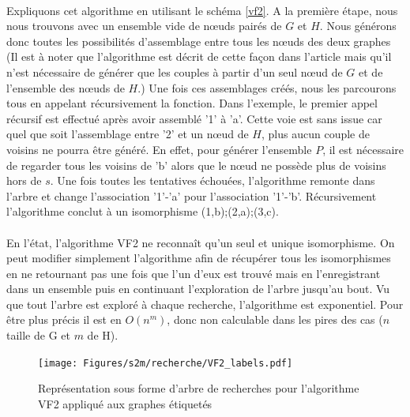 \documentclass[12pt,french,twoside]{report}
\begin{document}
\paragraph{}Expliquons cet algorithme en utilisant le schéma \ref{vf2}.
A la première étape, nous nous trouvons avec un ensemble vide de n\oe{}uds pairés de $G$ et $H$.
Nous générons donc toutes les possibilités d'assemblage entre tous les n\oe{}uds des deux graphes (Il est à noter que l'algorithme
est décrit de cette façon dans l'article mais qu'il n'est nécessaire de générer que les couples à partir d'un seul n\oe{}ud de $G$
et de l'ensemble des n\oe{}uds de $H$.)
Une fois ces assemblages créés, nous les parcourons tous en appelant récursivement la fonction.
Dans l'exemple, le premier appel récursif est effectué après avoir assemblé '1' à 'a'.
Cette voie est sans issue car quel que soit l'assemblage entre '2' et un n\oe{}ud de $H$, plus aucun couple de voisins ne pourra être
généré.
En effet, pour générer l'ensemble $P$, il est nécessaire de regarder tous les voisins de 'b' alors que le n\oe{}ud ne possède plus
de voisins hors de $s$.
Une fois toutes les tentatives échouées, l'algorithme remonte dans l'arbre et change l'association '1'-'a' pour l'association
'1'-'b'.
Récursivement l'algorithme conclut à un isomorphisme {(1,b);(2,a);(3,c)}.

\paragraph{}En l'état, l'algorithme VF2 ne reconnaît qu'un seul et unique isomorphisme.
On peut modifier simplement l'algorithme afin de récupérer tous les isomorphismes en ne retournant pas une fois que l'un d'eux est
trouvé mais en l'enregistrant dans un ensemble puis en continuant l'exploration de l'arbre jusqu'au bout.
Vu que tout l'arbre est exploré à chaque recherche, l'algorithme est exponentiel.
Pour être plus précis il est en $O(n^m)$, donc non calculable dans les pires des cas ($n$ taille de G et $m$ de H).

\begin{figure}[!ht]
  \texttt{[image: Figures/s2m/recherche/VF2\_labels.pdf]}
  \caption{\label{vf2_labels}Représentation sous forme d'arbre de recherches pour l'algorithme VF2 appliqué aux graphes étiquetés}
\end{figure}
\end{document}

